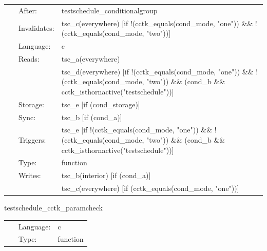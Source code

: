 \hspace{5mm}{\it test conditional clauses in schedule blocks } 


\hspace{5mm}

 \begin{tabular*}{160mm}{cll} 
~ & After:  & testschedule\_conditionalgroup \\ 
~ & Invalidates:  & tsc\_c(everywhere) [if !(cctk\_equals(cond\_mode, "one")) \&\& !(cctk\_equals(cond\_mode, "two"))] \\ 
~ & Language:  & c \\ 
~ & Reads:  & tsc\_a(everywhere) \\ 
~& ~ &tsc\_d(everywhere) [if !(cctk\_equals(cond\_mode, "one")) \&\& !(cctk\_equals(cond\_mode, "two")) \&\& (cond\_b \&\& cctk\_isthornactive("testschedule"))]\\ 
~ & Storage:  & tsc\_e [if (cond\_storage)] \\ 
~ & Sync:  & tsc\_b [if (cond\_a)] \\ 
~ & Triggers:  & tsc\_e [if !(cctk\_equals(cond\_mode, "one")) \&\& !(cctk\_equals(cond\_mode, "two")) \&\& (cond\_b \&\& cctk\_isthornactive("testschedule"))] \\ 
~ & Type:  & function \\ 
~ & Writes:  & tsc\_b(interior) [if (cond\_a)] \\ 
~& ~ &tsc\_c(everywhere) [if (cctk\_equals(cond\_mode, "one"))]\\ 
\end{tabular*} 


\vspace{5mm}


\hspace{5mm} testschedule\_cctk\_paramcheck 

\hspace{5mm}{\it test to see if function is placed in schedule and run at cctk\_paramcheck } 


\hspace{5mm}

 \begin{tabular*}{160mm}{cll} 
~ & Language:  & c \\ 
~ & Type:  & function \\ 
\end{tabular*} 


\vspace{5mm}


